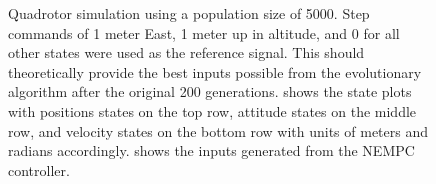 \documentclass[letterpaper, 10 pt, conference]{ieeeconf}  %
\begin{document}
	\begin{figure}[htbp]
		\centering
		\qquad
		\caption{Quadrotor simulation using a population size of 5000. Step commands of 1 meter East, 1 meter up in altitude, and 0 for all other states were used as the reference signal. This should theoretically provide the best inputs possible from the evolutionary algorithm after the original 200 generations.  shows the state plots with positions states on the top row, attitude states on the middle row, and velocity states on the bottom row with units of meters and radians accordingly.  shows the inputs generated from the NEMPC controller.}
		\label{fig:quad_sim5000}
	\end{figure}
	
\end{document}
